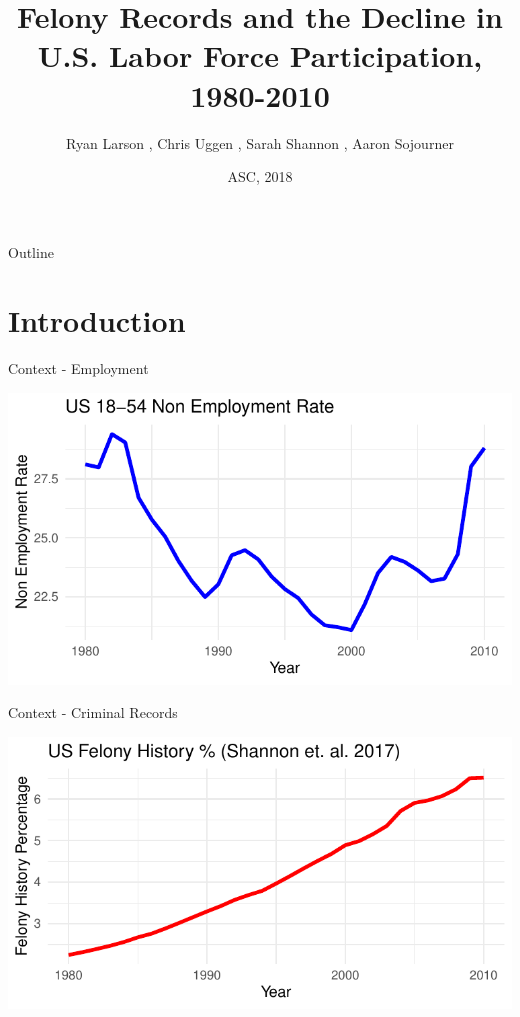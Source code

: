 \documentclass{beamer}
\title[Felony Records and the U.S. Labor Force]{Felony Records and the Decline in U.S. Labor Force Participation, 1980-2010}
\subtitle{}
\author[Larson et. al.]{Ryan Larson \inst{1}, Chris Uggen \inst{1}, Sarah Shannon \inst{2}, Aaron Sojourner \inst{3}}
\institute [UMN, UGA] %
{
  \inst{1}
  Department of Sociology, 
  University of Minnesota\\
  \inst{2}
  Department of Sociology, 
  University of Georgia\\
  \inst{3}
  Carlson School of Management, 
  University of Minnesota
 
}
\date{ASC, 2018}
\begin{document}
\begin{frame}
  \titlepage
\end{frame}

\begin{frame}{Outline}
  \tableofcontents
\end{frame}

\section{Introduction}

\begin{frame}{Context - Employment}



\begin{knitrout}
\color{fgcolor}
\includegraphics[width=\maxwidth]{figure/unnamed-chunk-2-1} 

\end{knitrout}



\end{frame}

\begin{frame}{Context - Criminal Records}


\begin{knitrout}
\color{fgcolor}
\includegraphics[width=\maxwidth]{figure/unnamed-chunk-3-1} 

\end{knitrout}



\end{frame}
\end{document}
